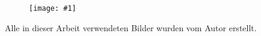 \documentclass[%
			paper=a4,%
			DIV12,
			liststotoc,
			bibtotoc,
			draft=false,%
			titlepage,
			numbers=noendperiod
			]{scrartcl}
\newcommand{\myfig}[5] {
 \begin{figure}[tbph]
	 \centering
	 \texttt{[image: \#1]}
	 \caption[#4]{#5}
	 \label{fig:#2}
 \end{figure}
}
\begin{document}
\myfig{img/testdata}{testdata}{width=\textwidth}{Laufzeitmessungen beider Ansätze im Vergliech}

\clearpage

\newpage

\listoffigures

Alle in dieser Arbeit verwendeten Bilder wurden vom Autor erstellt.

\lstlistoflistings

\listoftables

\newpage

\nocite{*} %

\end{document}

